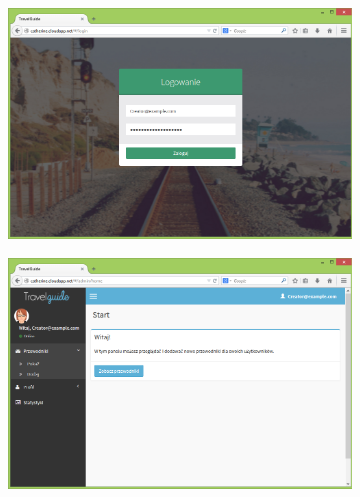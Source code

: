 \documentclass[a4paper]{book}
\begin{document}
		\begin{figure}[H]
			
			\begin{subfigure}{1\textwidth}
				\includegraphics[width=\textwidth]{screenshots/web/1logowanie.png}					
				\caption{\label{subfig:web_login}}
			\end{subfigure}
			\hfill
			\begin{subfigure}{1\textwidth}
				\includegraphics[width=\textwidth]{screenshots/web/2powitanie.png}					
				\caption{\label{subfig:web_welcome}}	
			\end{subfigure}
			
		\end{figure}
\end{document}
